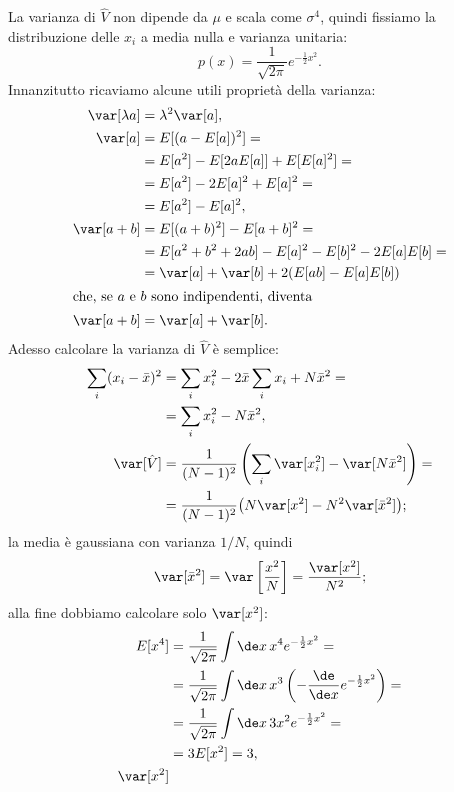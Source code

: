 \begin{solution}
	La varianza di $\hat V$ non dipende da $\mu$ e scala come $\sigma^4$,
	quindi fissiamo la distribuzione delle $x_i$ a media nulla e varianza unitaria:
	\begin{equation*}
		p(x) = \frac1{\sqrt{2\pi}} e^{-\frac12 x^2}.
	\end{equation*}
	Innanzitutto ricaviamo alcune utili proprietà della varianza:
	\begin{align*}
		\var[\lambda a] &= \lambda^2 \var[a], \\
		\var[a]
		&= E[(a-E[a])^2] = \\
		&= E[a^2] - E[2aE[a]] + E[E[a]^2] = \\
		&= E[a^2] - 2E[a]^2 + E[a]^2 = \\
		&= E[a^2] - E[a]^2, \\
		\var[a+b]
		&= E[(a+b)^2] - E[a+b]^2 = \\
		&= E[a^2 + b^2 + 2ab] - E[a]^2 - E[b]^2 - 2E[a]E[b] = \\
		&= \var[a] + \var[b] + 2(E[ab] - E[a]E[b]) \\
		\intertext{che, se $a$ e $b$ sono indipendenti, diventa}
		\var[a+b] &= \var[a] + \var[b].
	\end{align*}
	Adesso calcolare la varianza di $\hat V$ è semplice:
	\begin{align*}
		\sum_i (x_i-\bar x)^2
		&= \sum_ix_i^2 - 2\bar x\sum_ix_i + N\bar x^2 = \\
		&= \sum_ix_i^2 - N\bar x^2, \\
		\var[\hat V]
		&= \frac1{(N-1)^2} \left( \sum_i\var[x_i^2] - \var[N\bar x^2] \right) = \\
		&= \frac1{(N-1)^2} \big( N\var[x^2] - N^2\var[\bar x^2] \big);
	\end{align*}
	la media è gaussiana con varianza $1/N$, quindi
	\begin{align*}
		\var[\bar x^2]
		= \var \left[ \frac{x^2}N \right ]
		= \frac{\var[x^2]}{N^2};
	\end{align*}
	alla fine dobbiamo calcolare solo $\var[x^2]$:
	\begin{align*}
		E[x^4]
		&= \frac1{\sqrt{2\pi}} \int\de x\, x^4 e^{-\frac12 x^2} = \\
		&= \frac1{\sqrt{2\pi}} \int\de x\, x^3 \left (-\frac{\de}{\de x} e^{-\frac12 x^2} \right) = \\
		&= \frac1{\sqrt{2\pi}} \int\de x\, 3x^2 e^{-\frac12 x^2} = \\
		&= 3E[x^2] = 3, \\
		\var[x^2]

\end{align*}
\end{solution}
